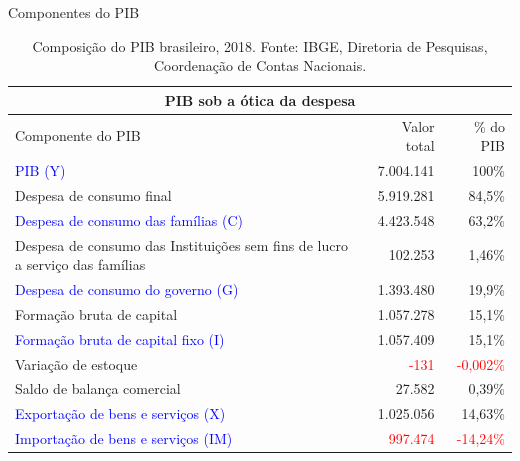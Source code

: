 \documentclass[10pt]{beamer}
\begin{document}
\begin{frame}{Componentes do PIB}
\begin{center}
\begin{table}
    \begin{tabular}{ |m{20em}|r|r|  }
 \hline
 \multicolumn{3}{|c|}{\textbf{{PIB sob a ótica da despesa}}} \\
 \hline
 \hline
 Componente do PIB & Valor total & \% do PIB \\
 \hline
\rowcolor{lightgray} \textcolor{blue}{PIB (Y)} & 7.004.141 & 100\% \\
 \hline
 \rowcolor{lightgray}
 Despesa de consumo final & 5.919.281 & 84,5\% \\
 \textcolor{blue}{Despesa de consumo das famílias (C)} & 4.423.548 & 63,2\% \\
Despesa de consumo das Instituições sem fins de lucro
          a serviço das famílias & 102.253 & 1,46\% \\ 
\textcolor{blue}{Despesa de consumo do governo (G)} & 1.393.480 & 19,9\% \\
\hline
\rowcolor{lightgray}
Formação bruta de capital & 1.057.278 & 15,1\% \\
\textcolor{blue}{Formação bruta de capital fixo (I)} & 1.057.409 & 15,1\% \\
Variação de estoque & \textcolor{red}{-131} & \textcolor{red}{-0,002\%} \\
\rowcolor{lightgray}
Saldo de balança comercial & 27.582 & 0,39\% \\
\textcolor{blue}{Exportação de bens e serviços (X)} & 1.025.056 & 14,63\% \\
\textcolor{blue}{Importação de bens e serviços (IM)} & \textcolor{red}{997.474} & \textcolor{red}{-14,24\%} \\
 \hline
\end{tabular}
\caption{Composição do PIB brasileiro, 2018. Fonte: IBGE, Diretoria de Pesquisas, Coordenação de Contas Nacionais.}
\end{table}
\end{center}
\end{frame}
\end{document}
